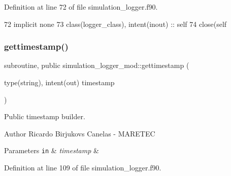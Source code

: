 Definition at line 72 of file simulation\+\_\+logger.\+f90.


\begin{DoxyCode}
72     \textcolor{keywordtype}{implicit none}
73     \textcolor{keywordtype}{class}(logger\_class), \textcolor{keywordtype}{intent(inout)} :: self
74     \textcolor{keyword}{close}(self%
\end{DoxyCode}
\mbox{\label{namespacesimulation__logger__mod_a0326a5eeb649b041064a01d96aef0989}} 
\subsubsection{\texorpdfstring{gettimestamp()}{gettimestamp()}}
{\footnotesize\ttfamily subroutine, public simulation\+\_\+logger\+\_\+mod\+::gettimestamp (\begin{DoxyParamCaption}\item[{type(string), intent(out)}]{timestamp }\end{DoxyParamCaption})}



Public timestamp builder. 

\begin{DoxyAuthor}{Author}
Ricardo Birjukovs Canelas -\/ M\+A\+R\+E\+T\+EC 
\end{DoxyAuthor}

\begin{DoxyParams}[1]{Parameters}
\mbox{\tt in}  & {\em timestamp} & \\
\hline
\end{DoxyParams}


Definition at line 109 of file simulation\+\_\+logger.\+f90.


